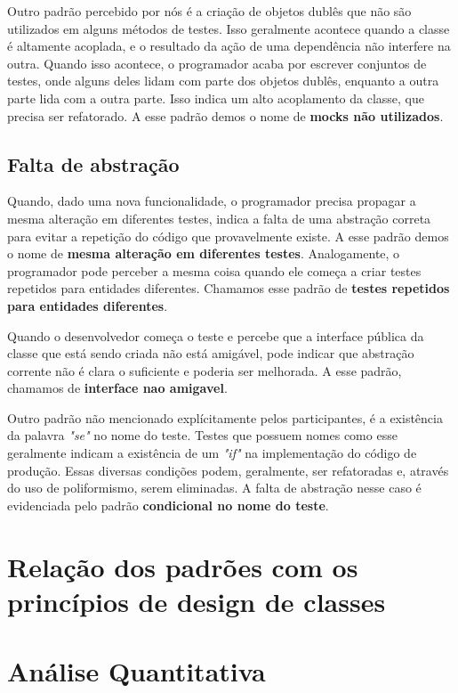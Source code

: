 Outro padrão percebido por nós é a criação de objetos dublês que não
são utilizados em alguns métodos de testes. Isso geralmente acontece quando
a classe é altamente acoplada, e o resultado da ação de uma dependência não
interfere na outra. Quando isso acontece, o programador acaba por escrever
conjuntos de testes, onde alguns deles lidam com parte dos objetos dublês,
enquanto a outra parte lida com a outra parte. Isso indica um alto acoplamento 
da classe, que precisa ser refatorado. A esse padrão demos o nome de
\textbf{mocks não utilizados}.


\subsection{Falta de abstração}

Quando, dado uma nova funcionalidade, o programador precisa propagar
a mesma alteração em diferentes testes, indica a falta de uma abstração 
correta para evitar a repetição do código que provavelmente existe. A 
esse padrão demos o nome de \textbf{mesma alteração em diferentes testes}.
Analogamente, o programador pode perceber a mesma coisa
quando ele começa a criar testes repetidos para entidades diferentes.
Chamamos esse padrão de \textbf{testes repetidos para entidades diferentes}.

Quando o desenvolvedor começa o teste e percebe que a interface pública da classe
que está sendo criada não está amigável, pode indicar que abstração
corrente não é clara o suficiente e poderia ser melhorada. A esse padrão,
chamamos de \textbf{interface nao amigavel}.

Outro padrão não mencionado explícitamente pelos participantes, 
é a existência da palavra \textit{"se"} no nome do teste. Testes que
possuem nomes como esse geralmente indicam a existência de um \textit{"if"} na implementação
do código de produção. Essas diversas condições podem, geralmente, ser refatoradas e,
através do uso de poliformismo, serem eliminadas. A falta de abstração nesse caso
é evidenciada pelo padrão \textbf{condicional no nome do teste}.

\section{Relação dos padrões com os princípios de design de classes}


\section{Análise Quantitativa}

